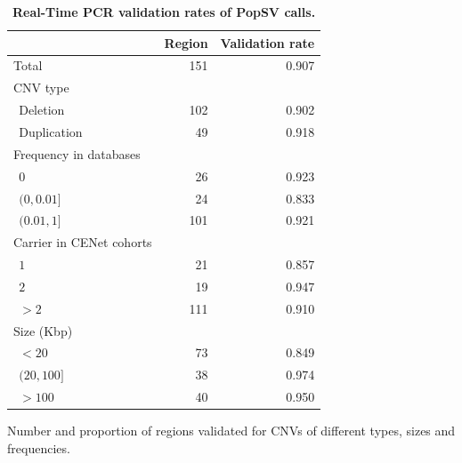 \begin{table}[!ht]
  \renewcommand{\arraystretch}{.7}
  \centering
  \caption[Real-Time PCR validation rates of {\sf PopSV} calls.]{{\bf Real-Time PCR validation rates of {\sf PopSV} calls.}}
  \begin{tabular}[c]{|l|r|r|}
    \hline
                            & Region & Validation rate \\
    \hline
    Total                   & 151    & 0.907           \\
    \hline
    CNV type                &        &                 \\
    $~~$Deletion            & 102    & 0.902           \\
    $~~$Duplication         & 49     & 0.918           \\
    \hline
    Frequency in databases   &        &                 \\
    $~~0$                   & 26     & 0.923           \\
    $~~(0,0.01]$            & 24     & 0.833           \\
    $~~(0.01,1]$            & 101    & 0.921           \\
    \hline
    Carrier in CENet cohorts&        &                 \\
    $~~1$                   & 21     & 0.857           \\
    $~~2$                   & 19     & 0.947           \\
    $~~>2$                  & 111    & 0.910           \\
    \hline
    Size (Kbp)              &        &                 \\
    $~~<20$                 & 73     & 0.849           \\
    $~~(20,100]$            & 38     & 0.974           \\
    $~~>100$                & 40     & 0.950           \\
    \hline
  \end{tabular}
  \begin{flushleft}
    Number and proportion of regions validated for CNVs of different types, sizes and frequencies.
  \end{flushleft}
  \label{tab:validationrates}
\end{table}


